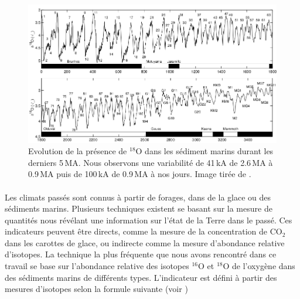 
\begin{figure}
	\centering
	\includegraphics[width=\linewidth]{figures/evol18Osur5MAlisiecki2005}
	\caption{Evolution de la présence de $^{18}$O dans les sédiment marins durant les derniers 5\,MA. Nous observons une variabilité de 41\,kA de 2.6\,MA à 0.9\,MA puis de 100\,kA de 0.9\,MA à nos jours. Image tirée de \cite{lisiecki2005}.}
	\label{fig:evol18Osur5MAlisiecki2005}
\end{figure}



\paragraph{} Les climats passés sont connus à partir de forages, dans de la glace ou des sédiments marins. Plusieurs techniques existent se basant sur la mesure de quantités nous révélant une information sur l'état de la Terre dans le passé. Ces indicateurs peuvent être directs, comme la mesure de la concentration de CO$_2$ dans les carottes de glace, ou indirecte comme la mesure d'abondance relative d'isotopes. La technique la plus fréquente que nous avons rencontré dans ce travail se base sur l'abondance relative des isotopes $^{16}$O et $^{18}$O de l'oxygène dans des sédiments marins de différents types. L'indicateur est défini à partir des mesures d'isotopes selon la formule suivante (voir \cite{wiki_d18O}) 

